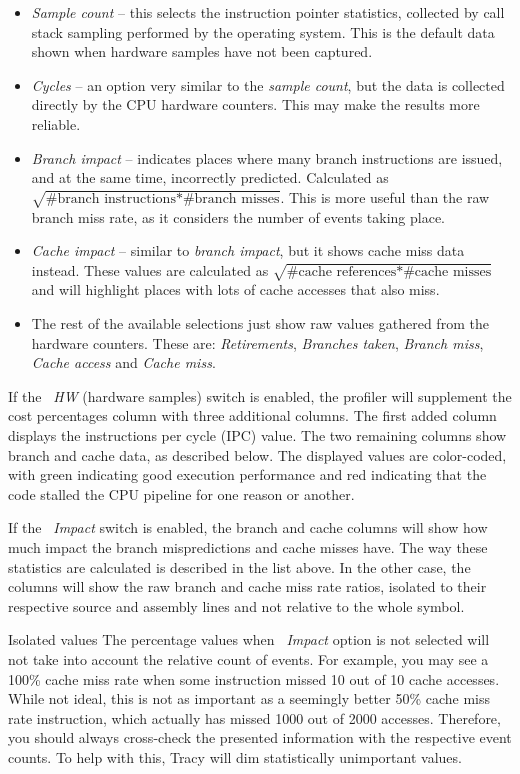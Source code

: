 \documentclass[hidelinks,titlepage,a4paper,twoside]{article}
\begin{document}
\begin{itemize}
\item \emph{Sample count} -- this selects the instruction pointer statistics, collected by call stack sampling performed by the operating system. This is the default data shown when hardware samples have not been captured.
\item \emph{Cycles} -- an option very similar to the \emph{sample count}, but the data is collected directly by the CPU hardware counters. This may make the results more reliable.
\item \emph{Branch impact} -- indicates places where many branch instructions are issued, and at the same time, incorrectly predicted. Calculated as $\sqrt{\text{\#branch instructions}*\text{\#branch misses}}$. This is more useful than the raw branch miss rate, as it considers the number of events taking place.
\item \emph{Cache impact} -- similar to \emph{branch impact}, but it shows cache miss data instead. These values are calculated as $\sqrt{\text{\#cache references}*\text{\#cache misses}}$ and will highlight places with lots of cache accesses that also miss.
\item The rest of the available selections just show raw values gathered from the hardware counters. These are: \emph{Retirements}, \emph{Branches taken}, \emph{Branch miss}, \emph{Cache access} and \emph{Cache miss}.
\end{itemize}

If the \emph{\faHammer{}~HW} (hardware samples) switch is enabled, the profiler will supplement the cost percentages column with three additional columns. The first added column displays the instructions per cycle (IPC) value. The two remaining columns show branch and cache data, as described below. The displayed values are color-coded, with green indicating good execution performance and red indicating that the code stalled the CPU pipeline for one reason or another.

If the \emph{\faCarCrash{}~Impact} switch is enabled, the branch and cache columns will show how much impact the branch mispredictions and cache misses have. The way these statistics are calculated is described in the list above. In the other case, the columns will show the raw branch and cache miss rate ratios, isolated to their respective source and assembly lines and not relative to the whole symbol.

\begin{bclogo}[
noborder=true,
couleur=black!5,
logo=\bcattention
]{Isolated values}
The percentage values when \emph{\faCarCrash{}~Impact} option is not selected will not take into account the relative count of events. For example, you may see a 100\% cache miss rate when some instruction missed 10 out of 10 cache accesses. While not ideal, this is not as important as a seemingly better 50\% cache miss rate instruction, which actually has missed 1000 out of 2000 accesses. Therefore, you should always cross-check the presented information with the respective event counts. To help with this, Tracy will dim statistically unimportant values.
\end{bclogo}
\end{document}
